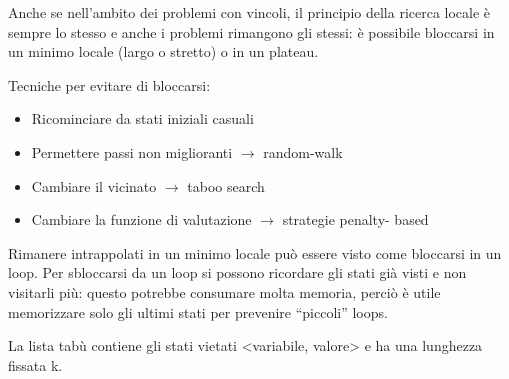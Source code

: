 Anche se nell'ambito dei problemi con vincoli, il principio della ricerca
locale è sempre lo stesso e anche i problemi rimangono gli stessi:
è possibile bloccarsi in un minimo locale (largo o stretto) o in un plateau.

Tecniche per evitare di bloccarsi:

\begin{itemize}
 \item Ricominciare da stati iniziali casuali
 \item Permettere passi non miglioranti $\rightarrow$ random-walk
 \item Cambiare il vicinato $\rightarrow$ taboo search
 \item Cambiare la funzione di valutazione $\rightarrow$ strategie penalty-
based
\end{itemize}

Rimanere intrappolati in un minimo locale può essere visto come bloccarsi
in un loop. Per sbloccarsi da un loop si possono ricordare gli stati
già visti e non visitarli più: questo potrebbe consumare molta memoria,
perciò è utile memorizzare solo gli ultimi stati per prevenire ``piccoli''
loops.

La lista tabù contiene gli stati vietati <variabile, valore> e ha una lunghezza
fissata k.

